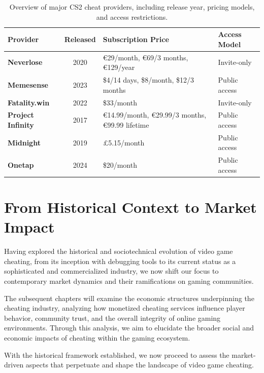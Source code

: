 \newpage

\begin{table}[h!]
    \centering
    \renewcommand{\arraystretch}{1.4}
    \begin{tabular}{|p{3.2cm}|c|p{4cm}|p{3.8cm}|}
        \hline
        \textbf{Provider} & \textbf{Released} & \textbf{Subscription Price} & \textbf{Access Model} \\
        \hline
        \textbf{Neverlose} \parencite{neverlose2020} & 2020 & €29/month, €69/3 months, €129/year & Invite-only \\
        \hline
        \textbf{Memesense} \parencite{memesense2023} & 2023 & \$4/14 days, \$8/month, \$12/3 months & Public access \\
        \hline
        \textbf{Fatality.win} \parencite{fatality2022} & 2022 & \$33/month & Invite-only \\
        \hline
        \textbf{Project Infinity} \parencite{projectinfinity2017} & 2017 & €14.99/month, €29.99/3 months, €99.99 lifetime & Public access \\
        \hline
        \textbf{Midnight} \parencite{midnight2019} & 2019 & £5.15/month & Public access \\
        \hline
        \textbf{Onetap} \parencite{onetap2024} & 2024 & \$20/month & Public access \\
        \hline
    \end{tabular}
    \caption{Overview of major CS2 cheat providers, including release year, pricing models, and access restrictions.}
    \label{tab:cs2_cheat_providers}
\end{table}


\section*{From Historical Context to Market Impact}

Having explored the historical and sociotechnical evolution of video game cheating, from its inception with debugging tools to its current status as a sophisticated and commercialized industry, we now shift our focus to contemporary market dynamics and their ramifications on gaming communities.

The subsequent chapters will examine the economic structures underpinning the cheating industry, analyzing how monetized cheating services influence player behavior, community trust, and the overall integrity of online gaming environments. Through this analysis, we aim to elucidate the broader social and economic impacts of cheating within the gaming ecosystem.

With the historical framework established, we now proceed to assess the market-driven aspects that perpetuate and shape the landscape of video game cheating.
\newpage



